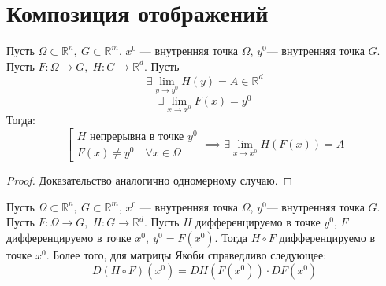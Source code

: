\documentclass[11pt]{article}
\begin{document}
\section{Композиция отображений}

\begin{theorem}
    Пусть $\Omega \subset \mathbb{R}^n, \ G \subset \mathbb{R}^m$, $x^0$  --- внутренняя точка $\Omega$, $y^0$--- внутренняя точка $G$. Пусть $F \colon \Omega \to G, \; H \colon G \to \mathbb{R}^d$.
    Пусть \[\exists \lim\limits_{y \to y^0} H(y) = A \in \mathbb{R}^d\] 
    \[\exists \lim\limits_{x \to x^0} F(x) = y^0\] 
    Тогда:
    \[\left[\begin{array}{l}
        H \text{ непрерывна в точке } y^0 \\ F(x) \ne y^0 \quad \forall x \in \Omega
    \end{array}\right. \implies \exists \lim\limits_{x \to x^0} H(F(x)) = A\]
\end{theorem}

\begin{proof}
    Доказательство аналогично одномерному случаю.
\end{proof}

\begin{theorem}
    Пусть $\Omega \subset \mathbb{R}^n, \ G \subset \mathbb{R}^m$, $x^0$  --- внутренняя точка $\Omega$, $y^0$--- внутренняя точка $G$. Пусть $F \colon \Omega \to G, \; H \colon G \to \mathbb{R}^d$.
    Пусть $H$ дифференцируемо в точке $y^0$, $F$ дифференцируемо в точке $x^0, \ y^0 = F\left(x^0\right)$. Тогда $H \circ F$
    дифференцируемо в точке $x^0$. Более того, для матрицы Якоби справедливо следующее:
    \[D\left(H \circ F\right)\left(x^0\right) = DH\left(F\left(x^0\right)\right) \cdot DF\left(x^0\right)\] 
\end{theorem}
\end{document}
